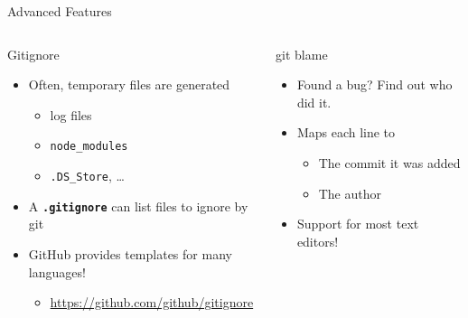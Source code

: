 \documentclass[compress,aspectratio=169]{beamer}
\begin{document}
  \begin{frame}{Advanced Features}
    \begin{columns}
      \begin{column}{0.5\textwidth}
        \begin{block}{Gitignore}
          \begin{itemize}
            \item Often, temporary files are generated
              \begin{itemize}
                \item log files
                \item \texttt{node\_modules}
                \item \texttt{.DS\_Store}, \dots
              \end{itemize}
            \item A \textbf{\texttt{.gitignore}} can list files to ignore by git
            \item GitHub provides templates for many languages!
              \begin{itemize}
                \item \href{https://github.com/github/gitignore}{\url{https://github.com/github/gitignore}}
              \end{itemize}
          \end{itemize}
        \end{block}
      \end{column}
      \begin{column}{0.5\textwidth}
        \pause
        \begin{block}{git blame}
          \begin{itemize}
            \item Found a bug? Find out who did it.
            \item Maps each line to
              \begin{itemize}
                \item The commit it was added
                \item The author
              \end{itemize}
            \item Support for most text editors!
          \end{itemize}
        \end{block}
      \end{column}
    \end{columns}
  \end{frame}
\end{document}
